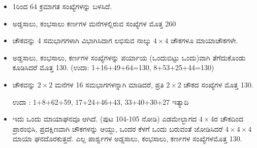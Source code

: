 \begin{itemize}
	\item 1ರಿಂದ 64 ಕ್ರಮಾಗತ ಸಂಖ್ಯೆಗಳನ್ನು ಬಳಸಿದೆ.
	\item ಅಡ್ಡಸಾಲು, ಕಂಭಸಾಲು ಕರ್ಣಗಳ ಮನೆಗಳಲ್ಲಿರುವ ಸಂಖ್ಯೆಗಳ ಮೊತ್ತ 260
	\item ಚೌಕವನ್ನು 4 ಸಮಭಾಗಗಳಾಗಿ ವಿಭಾಗಿಸಿದಾಗ ಲಭಿಸುವ ನಾಲ್ಕು $4 \times 4$ ಚೌಕಗಳೂ ಮಾಯಾಚೌಕಗಳೇ.
	\item ಅಡ್ಡಸಾಲು, ಕಂಭಸಾಲು, ಕರ್ಣಗಳ ಸಂಖ್ಯೆಗಳನ್ನು ಪರ್ಯಾಯ (ಒಂದು\break ಬಿಟ್ಟು ಒಂದು)ವಾಗಿ ತೆಗೆದುಕೊಂಡು ಕೂಡಿಸಿದರೆ ಮೊತ್ತ 130. (ಉದಾ: 1+16+49+64=130, 8+53+25+44=130)
	\item ಚೌಕವನ್ನು $2 \times 2$ ಮನೆಗಳ 16 ಸಮಭಾಗಗಳನ್ನಾಗಿ ಮಾಡಿದರೆ, ಪ್ರತಿ $2 \times 2$ ಚೌಕದ ಸಂಖ್ಯೆಗಳ ಮೊತ್ತ 130.

	ಉದಾ : 1+8+62+59, 17+24+46+43, 33+40+30+27 ಇತ್ಯಾದಿ
	\item ಇದು ಒಂದು ಮಾಯಾಘನವೂ ಆಗಿದೆ. (ಪುಟ 104-105 ನೋಡಿ) ಎಡ\break ಮೇಲ್ಭಾಗದ $4 \times 4$ರ ಚೌಕದಿಂದ ಪ್ರಾರಂಭಿಸಿ, ಪ್ರದಕ್ಷಿಣವಾಗಿ ಚೌಕಗಳನ್ನು ಆಯ್ದು, ಒಂದರ ಕೆಳಗೆ ಒಂದು ಬರುವಂತೆ ಜೋಡಿಸಿದರೆ $4 \times 4 \times 4$ ಮಾಯಾ ಘನ\break ದೊರಕುತ್ತದೆ. ಎಲ್ಲ ಪಾರ್ಶ್ವಗಳ ಅಡ್ಡಸಾಲು, ಕಂಭಸಾಲು, ಕರ್ಣಗಳ ಸಂಖ್ಯೆಗಳ\break ಮೊತ್ತ 130.
\end{itemize}

\smallskip

